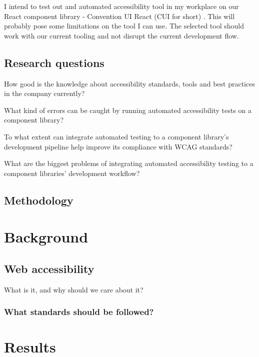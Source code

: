 \documentclass{master_thesis}
\begin{document}
I intend to test out and automated accessibility tool in my workplace on our React component library - Convention UI React (CUI for short) . This will probably pose some limitations on the tool I can use. The selected tool should work with our current tooling and not disrupt the current development flow.

	\subsection{Research questions}

	\begin{RQlist}
		\item How good is the knowledge about accessibility standards, tools and best practices in the company currently?
		\item What kind of errors can be caught by running automated accessibility tests on a component library?
		\item To what extent can integrate automated testing to a component library's development pipeline help improve its compliance with WCAG standards?
		\item What are the biggest problems of integrating automated accessibility testing to a component libraries' development workflow?
	\end{RQlist}
	\subsection{Methodology}

\section{Background}
	\subsection{Web accessibility}
	What is it, and why should we care about it?
		\subsubsection{What standards should be followed?}




\section{Results}
\end{document}
